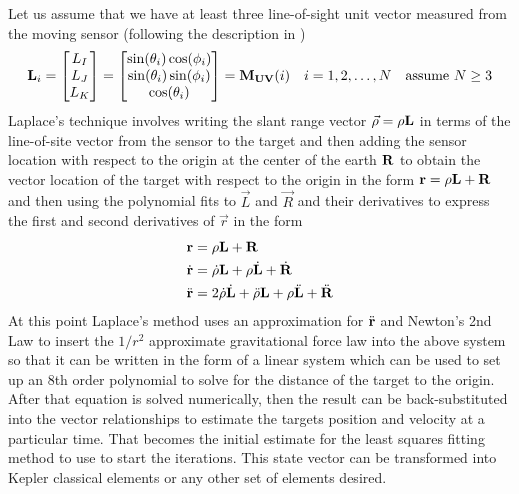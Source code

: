 Let us assume that we have at least three line-of-sight unit vector measured from the moving sensor (following the description in \cite{Bate})
\begin{align*}
{\bf L}_i = 
\begin{bmatrix}
L_I\\
L_J\\
L_K\\
\end{bmatrix}
= 
\begin{bmatrix}
\sin(\theta_i)\cos(\phi_i)\\
\sin(\theta_i)\sin(\phi_i)\\
\cos(\theta_i)\\
\end{bmatrix} = {\bf M_{UV}}(i) \quad i = 1,2,\hdots,N  \quad\hbox{assume $N\ge3$}
\end{align*}
Laplace's technique involves writing the slant range vector $\vec{\bf \rho} = \rho{\bf L}$ in terms of the line-of-site vector from the sensor to the target and then adding the sensor location with respect to the origin at the center of the earth $\bf R$ to obtain the vector location of the target with respect to the origin in the form
${\bf r} = \rho{\bf L} + {\bf R}$ and then using the polynomial fits to $\vec{L}$ and $\vec{R}$ and their derivatives to express the first and second derivatives of $\vec{r}$ in the form 
\begin{align*}
{\bf r} &= \rho{\bf L} + {\bf R}\\
\dot{\bf r} &= \dot\rho{\bf L} + \rho\dot{\bf L} + \dot{\bf R}\\
\ddot{\bf r} &= 2\dot\rho \dot{\bf L} + \ddot\rho{\bf L}+ \rho\ddot{\bf L} + \ddot{\bf R}\\
\end{align*}
At this point Laplace's method uses an approximation for $\ddot{\bf r}$ and Newton's 2nd Law to insert the $1/r^2$ approximate gravitational force law into the above system so that it can be written in the form of a linear system which can be used to set up an 8th order polynomial to solve for the distance of the target to the origin. After that equation is solved numerically, then the result can be back-substituted into the vector relationships to estimate the targets position and velocity at a particular time. That becomes the initial estimate for the least squares fitting method to use to start the iterations. This state vector can be transformed into Kepler classical elements or any other set of elements desired. 

